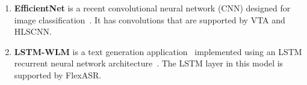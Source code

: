 \begin{enumerate}[leftmargin=*]


\item \textbf{EfficientNet} is a recent convolutional neural network (CNN) designed for image classification~\cite{tan2019efficientnet}. 
It has convolutions that are supported by VTA and HLSCNN.



\item \textbf{LSTM-WLM} is a text generation application~\cite{pt2020wlm} implemented using an LSTM recurrent neural network architecture~\cite{graves2014towards}. The LSTM layer in this model is supported by FlexASR.



\end{enumerate}
